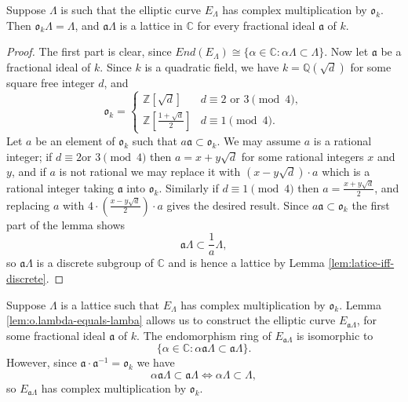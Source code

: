 \begin{lem}
  \label{lem:o.lambda-equals-lamba}
  Suppose $\Lambda$ is such that the elliptic curve $E_{\Lambda}$ has complex
  multiplication by $\mathfrak{o}_{k}$.  Then $\mathfrak{o}_{k}\Lambda = \Lambda$,
  and $\mathfrak{a}\Lambda$ is a lattice in $\mathbb{C}$ for every fractional ideal
  $\mathfrak{a}$ of $k$.
\end{lem}
\begin{proof}
  The first part is clear, since $End(E_{\Lambda}) \cong \{\alpha \in \mathbb{C}
  \colon \alpha\Lambda \subset \Lambda \}$.  Now let $\mathfrak{a}$ be a fractional
  ideal of $k$.  Since $k$ is a quadratic field, we have $k = \mathbb{Q}(\sqrt{d})$
  for some square free integer $d$, and
  \begin{equation*}
    \mathfrak{o}_{k} =
    \begin{cases}
      \mathbb{Z}[\sqrt{d}] & d \equiv 2 \text{ or } 3 \pmod{4} ,\\
      \mathbb{Z}[\frac{1 + \sqrt{d}}{2}] & d \equiv 1 \pmod{4}.
    \end{cases}
  \end{equation*}
  Let $a$ be an element of $\mathfrak{o}_{k}$ such that $a\mathfrak{a} \subset
  \mathfrak{o}_{k}$.  We may assume $a$ is a rational integer; if $d \equiv 2 \text{
    or } 3 \pmod{4}$ then $a = x + y\sqrt{d}$ for some rational integers $x$ and $y$,
  and if $a$ is not rational we may replace it with $(x - y\sqrt{d})\cdot a$ which is
  a rational integer taking $\mathfrak{a}$ into $\mathfrak{o}_{k}$.  Similarly if $d
  \equiv 1 \pmod{4}$ then $a = \frac{x + y\sqrt{d}}{2}$, and replacing $a$ with
  $4\cdot (\frac{x - y\sqrt{d}}{2})\cdot a$ gives the desired result.  Since
  $a\mathfrak{a} \subset \mathfrak{o}_{k}$ the first part of the lemma shows
  \begin{equation*}
    \mathfrak{a}\Lambda \subset \frac{1}{a}\Lambda,
  \end{equation*}
  so $\mathfrak{a}\Lambda$ is a discrete subgroup of $\mathbb{C}$ and is hence a
  lattice by Lemma \ref{lem:latice-iff-discrete}.
\end{proof}

Suppose $\Lambda$ is a lattice such that $E_{\Lambda}$ has complex multiplication by
$\mathfrak{o}_{k}$.  Lemma \ref{lem:o.lambda-equals-lamba} allows us to construct the
elliptic curve $E_{\mathfrak{a}\Lambda}$, for some fractional ideal $\mathfrak{a}$ of
$k$.  The endomorphism ring of $E_{\mathfrak{a}\Lambda}$ is isomorphic to
\begin{equation*}
  \{\alpha \in \mathbb{C} : \alpha \mathfrak{a}\Lambda \subset \mathfrak{a}\Lambda \}.
\end{equation*}
However, since $\mathfrak{a} \cdot \mathfrak{a}^{-1} = \mathfrak{o}_{k}$ we have
\begin{equation*}
  \alpha \mathfrak{a}\Lambda \subset \mathfrak{a}\Lambda
  \Leftrightarrow
  \alpha\Lambda \subset \Lambda ,
\end{equation*}
so $E_{\mathfrak{a}\Lambda}$ has complex multiplication by $\mathfrak{o}_{k}$.

